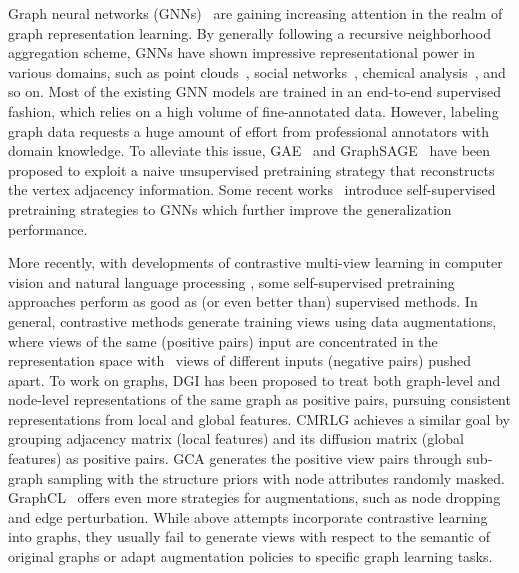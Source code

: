Graph neural networks (GNNs)~\cite{kipf2016gcn,velivckovic2017gat,xu2018gin,hamilton2017graphsage} are gaining increasing attention in the realm of graph representation learning. By generally following a recursive neighborhood aggregation scheme, GNNs have shown impressive representational power in various domains, such as point clouds~\cite{shi2020pointgnn}, social networks~\cite{fan2019gnnsocial}, chemical analysis~\cite{de2018molgan}, and so on. Most of the existing GNN models are trained in an end-to-end supervised fashion, which relies on a high volume of fine-annotated data. However, labeling graph data requests a huge amount of effort from professional annotators with domain knowledge. To alleviate this issue, GAE~\cite{kipf2016vgae} and GraphSAGE~\cite{hamilton2017graphsage} have been proposed to exploit a naive unsupervised pretraining strategy that reconstructs the vertex adjacency information. Some recent works~\cite{hu2019pretraingnn,you2020sslgcn} introduce self-supervised pretraining strategies to GNNs which further improve the generalization performance. 

More recently, with developments of contrastive multi-view learning in computer vision \cite{he2020moco, chen2020simclr,tian2019cmc} and natural language processing \cite{yang2019xlnet,logeswaran2018efficient}, some self-supervised pretraining approaches perform as good as (or even better than) supervised methods.
In general, contrastive methods generate training views using data augmentations, where views of the same (positive pairs) input are concentrated in the representation space with~%
views of different inputs (negative pairs) pushed apart. %
To work on graphs, DGI \cite{velivckovic2018dgi} has been proposed to treat both graph-level and node-level representations of the same graph as positive pairs, pursuing consistent representations from local and global features. CMRLG \cite{hassani2020cmcgnn} achieves a similar goal by grouping adjacency matrix (local features) and its diffusion matrix (global features) as positive pairs. GCA \cite{zhu2020gca} generates the positive view pairs through sub-graph sampling with the structure priors with node attributes randomly masked. GraphCL~\cite{you2020graphcl} offers even more strategies for augmentations, such as node dropping and edge perturbation. While above attempts incorporate contrastive learning into graphs, they usually fail to generate views with respect to the semantic of original graphs or adapt augmentation policies to specific graph learning tasks.

